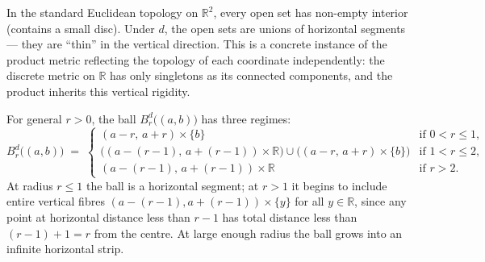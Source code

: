 \begin{remark*}
In the standard Euclidean topology on $\mathbb{R}^2$, every open set has
non-empty interior (contains a small disc).
Under $d$, the open sets are unions of horizontal segments --- they are
``thin'' in the vertical direction.
This is a concrete instance of the product metric reflecting the topology
of each coordinate independently:
the discrete metric on $\mathbb{R}$ has only singletons as its connected
components, and the product inherits this vertical rigidity.
\end{remark*}

\begin{remark*}
For general $r > 0$, the ball $B_r^{d}\bigl((a,b)\bigr)$ has three regimes:
\[
B_r^{d}\bigl((a,b)\bigr) \;=\;
\begin{cases}
(a-r,\, a+r) \times \{b\}
  & \text{if } 0 < r \le 1, \\[4pt]
\bigl((a-(r-1),\, a+(r-1)) \times \mathbb{R}\bigr)
\cup
\bigl((a-r,\,a+r)\times\{b\}\bigr)
  & \text{if } 1 < r \le 2, \\[4pt]
(a-(r-1),\, a+(r-1)) \times \mathbb{R}
  & \text{if } r > 2.
\end{cases}
\]
At radius $r \le 1$ the ball is a horizontal segment;
at $r > 1$ it begins to include entire vertical fibres
$(a-(r-1), a+(r-1)) \times \{y\}$ for all $y \in \mathbb{R}$,
since any point at horizontal distance less than $r-1$
has total distance less than $(r-1)+1 = r$ from the centre.
At large enough radius the ball grows into an infinite horizontal strip.
\end{remark*}

